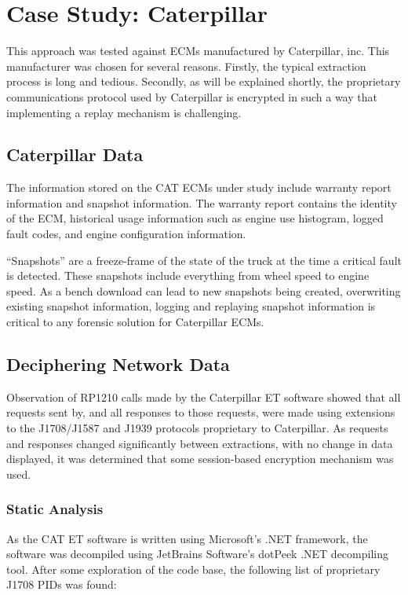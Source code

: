 \chapter{Case Study: Caterpillar}

This approach was tested against ECMs manufactured by Caterpillar, inc. This manufacturer was
chosen for several reasons. Firstly, the typical extraction process is long and tedious. 
Secondly, as will be explained shortly, the proprietary communications protocol used
by Caterpillar is encrypted in such a way that implementing a replay mechanism is challenging.

\section{Caterpillar Data}

The information stored on the CAT ECMs under study include warranty report information and snapshot
information. The warranty report contains the identity of the ECM, historical usage information such as engine use histogram,
logged fault codes, and engine configuration information.

``Snapshots'' are a freeze-frame of the state of the truck at the time a critical fault is detected. These snapshots
include everything from wheel speed to engine speed. As a bench download can lead to new snapshots being created, overwriting
existing snapshot information, logging and replaying snapshot information is critical to any forensic solution for
Caterpillar ECMs.

\section{Deciphering Network Data}

Observation of RP1210 calls made by the Caterpillar ET software showed that all requests sent by,
and all responses to those requests, were made using extensions to the J1708/J1587 and J1939 protocols
proprietary to Caterpillar. As requests and responses changed significantly between extractions, with
no change in data displayed, it was determined that some session-based encryption mechanism was
used.

\subsection{Static Analysis}

As the CAT ET software is written using Microsoft's .NET framework, the software was decompiled
using JetBrains Software's dotPeek .NET decompiling tool. After some exploration of the code base,
the following list of proprietary J1708 PIDs was found:

